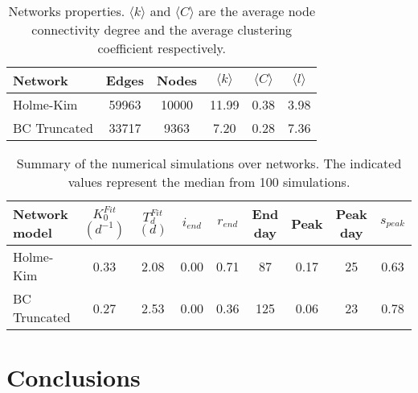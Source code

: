 \documentclass[DIV=12, BCOR=0pt]{scrartcl}  %
\begin{document}
	\begin{table}[h!]
		\centering
		\caption{Networks properties. $\langle k \rangle$ and $\langle C \rangle$ are the average node connectivity degree and the average clustering coefficient respectively. }
		\label{tab:lock_networks}
		\begin{tabular}{lccccc}
			\toprule
			Network &  Edges &  Nodes & $\langle k \rangle$ & $\langle C \rangle$ & $\langle l \rangle$\\
			\midrule
			Holme-Kim 		&  59963 &  10000 & 11.99 &  0.38 &  3.98 \\
			BC Truncated 	&  33717 &   9363 &  7.20 &  0.28 &  7.36 \\
			
			\bottomrule
		\end{tabular}
	\end{table}

	\begin{table}[h!]
		\centering
		\caption{Summary of the numerical simulations over networks. The indicated values represent the median from 100 simulations.}
		\label{tab:lock_results}
		\begin{tabular}{lcccccccc}
			\toprule
			Network model & $K_0^{Fit}$ $(d^{-1})$ & $T_d^{Fit}$ $(d)$ & $i_{end}$ & $r_{end}$ & End day & Peak  & Peak day & $s_{peak}$\\
			\midrule
		 	Holme-Kim 		&    0.33 &   2.08 &  0.00 &  0.71 &  	 87 &  0.17 &   25 &	0.63\\
			BC Truncated	&    0.27 &   2.53 &  0.00 &  0.36 & 		125 &  0.06 &   23 &	0.78\\
			
			
			\bottomrule
		\end{tabular}
	\end{table}
	
	
	\section{Conclusions}
%
%		
  \footnotesize
	
\end{document}

